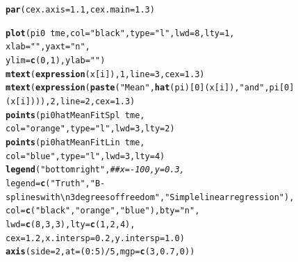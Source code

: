 \documentclass{article}\usepackage[]{graphicx}\usepackage[]{color}
\makeatletter
\newcommand{\hlnum}[1]{\textcolor[rgb]{0.686,0.059,0.569}{#1}}%
\newcommand{\hlstr}[1]{\textcolor[rgb]{0.192,0.494,0.8}{#1}}%
\newcommand{\hlcom}[1]{\textcolor[rgb]{0.678,0.584,0.686}{\textit{#1}}}%
\newcommand{\hlopt}[1]{\textcolor[rgb]{0,0,0}{#1}}%
\newcommand{\hlstd}[1]{\textcolor[rgb]{0.345,0.345,0.345}{#1}}%
\newcommand{\hlkwc}[1]{\textcolor[rgb]{0.333,0.667,0.333}{#1}}%
\newcommand{\hlkwd}[1]{\textcolor[rgb]{0.737,0.353,0.396}{\textbf{#1}}}%
\newenvironment{kframe}{%
 \def\at@end@of@kframe{}%
 \ifinner\ifhmode%
  \def\at@end@of@kframe{\end{minipage}}%
  \begin{minipage}{\columnwidth}%
 \fi\fi%
 \def\FrameCommand##1{\hskip\@totalleftmargin \hskip-\fboxsep
 \colorbox{shadecolor}{##1}\hskip-\fboxsep
     \hskip-\linewidth \hskip-\@totalleftmargin \hskip\columnwidth}%
 \MakeFramed {\advance\hsize-\width
   \@totalleftmargin\z@ \linewidth\hsize
   \@setminipage}}%
 {\par\unskip\endMakeFramed%
 \at@end@of@kframe}
\newenvironment{knitrout}{}{} %
\makeatother
\begin{document}
\begin{knitrout}
\color{fgcolor}\begin{kframe}
\begin{alltt}
\hlkwd{par}\hlstd{(}\hlkwc{cex.axis} \hlstd{=} \hlnum{1.1}\hlstd{,} \hlkwc{cex.main}\hlstd{=}\hlnum{1.3}\hlstd{)}

\hlkwd{plot}\hlstd{(pi0} \hlopt{~} \hlstd{tme,}\hlkwc{col}\hlstd{=}\hlstr{"black"}\hlstd{,}\hlkwc{type}\hlstd{=}\hlstr{"l"}\hlstd{,}\hlkwc{lwd}\hlstd{=}\hlnum{8}\hlstd{,} \hlkwc{lty}\hlstd{=}\hlnum{1}\hlstd{,}
     \hlkwc{xlab}\hlstd{=}\hlstr{""}\hlstd{,} \hlkwc{yaxt} \hlstd{=} \hlstr{"n"}\hlstd{,}
     \hlkwc{ylim}\hlstd{=}\hlkwd{c}\hlstd{(}\hlnum{0}\hlstd{,}\hlnum{1}\hlstd{),} \hlkwc{ylab}\hlstd{=}\hlstr{""}\hlstd{)}
\hlkwd{mtext}\hlstd{(}\hlkwd{expression}\hlstd{(x[i]),} \hlnum{1}\hlstd{,} \hlkwc{line}\hlstd{=}\hlnum{3}\hlstd{,} \hlkwc{cex}\hlstd{=}\hlnum{1.3}\hlstd{)}
\hlkwd{mtext}\hlstd{(}\hlkwd{expression}\hlstd{(}\hlkwd{paste}\hlstd{(}\hlstr{"Mean "}\hlstd{,} \hlkwd{hat}\hlstd{(pi)[}\hlnum{0}\hlstd{](x[i]),}\hlstr{" and "}\hlstd{, pi[}\hlnum{0}\hlstd{](x[i]))),} \hlnum{2}\hlstd{,} \hlkwc{line}\hlstd{=}\hlnum{2}\hlstd{,} \hlkwc{cex}\hlstd{=}\hlnum{1.3}\hlstd{)}
\hlkwd{points}\hlstd{(pi0hatMeanFitSpl} \hlopt{~} \hlstd{tme,}
       \hlkwc{col}\hlstd{=}\hlstr{"orange"}\hlstd{,}\hlkwc{type}\hlstd{=}\hlstr{"l"}\hlstd{,}\hlkwc{lwd}\hlstd{=}\hlnum{3}\hlstd{,} \hlkwc{lty}\hlstd{=}\hlnum{2}\hlstd{)}
\hlkwd{points}\hlstd{(pi0hatMeanFitLin} \hlopt{~} \hlstd{tme,}
       \hlkwc{col}\hlstd{=}\hlstr{"blue"}\hlstd{,}\hlkwc{type}\hlstd{=}\hlstr{"l"}\hlstd{,}\hlkwc{lwd}\hlstd{=}\hlnum{3}\hlstd{,} \hlkwc{lty}\hlstd{=}\hlnum{4}\hlstd{)}
\hlkwd{legend}\hlstd{(}\hlstr{"bottomright"}\hlstd{,} \hlcom{##x=-100, y=0.3, }
       \hlkwc{legend}\hlstd{=}\hlkwd{c}\hlstd{(}\hlstr{"Truth"}\hlstd{,} \hlstr{"B-splines with\textbackslash{}n3 degrees of freedom"}\hlstd{,} \hlstr{"Simple linear regression"}\hlstd{),}
       \hlkwc{col}\hlstd{=}\hlkwd{c}\hlstd{(}\hlstr{"black"}\hlstd{,} \hlstr{"orange"}\hlstd{,} \hlstr{"blue"}\hlstd{),} \hlkwc{bty}\hlstd{=}\hlstr{"n"}\hlstd{,}
       \hlkwc{lwd}\hlstd{=}\hlkwd{c}\hlstd{(}\hlnum{8}\hlstd{,}\hlnum{3}\hlstd{,}\hlnum{3}\hlstd{),} \hlkwc{lty}\hlstd{=}\hlkwd{c}\hlstd{(}\hlnum{1}\hlstd{,}\hlnum{2}\hlstd{,}\hlnum{4}\hlstd{),}
       \hlkwc{cex}\hlstd{=}\hlnum{1.2}\hlstd{,} \hlkwc{x.intersp}\hlstd{=}\hlnum{0.2}\hlstd{,} \hlkwc{y.intersp}\hlstd{=}\hlnum{1.0}\hlstd{)}
\hlkwd{axis}\hlstd{(}\hlkwc{side}\hlstd{=}\hlnum{2}\hlstd{,} \hlkwc{at}\hlstd{=(}\hlnum{0}\hlopt{:}\hlnum{5}\hlstd{)}\hlopt{/}\hlnum{5}\hlstd{,} \hlkwc{mgp}\hlstd{=}\hlkwd{c}\hlstd{(}\hlnum{3}\hlstd{,} \hlnum{0.7}\hlstd{,} \hlnum{0}\hlstd{))}
\end{alltt}
\end{kframe}


\end{knitrout}
\end{document}
